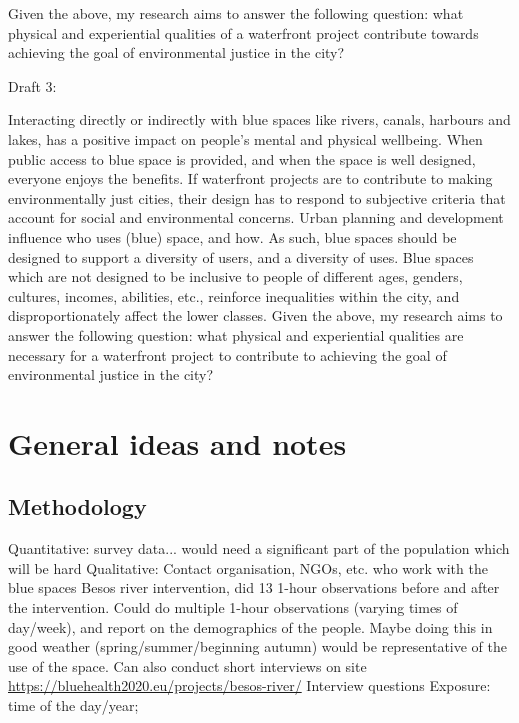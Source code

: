\documentclass{article}
\begin{document}
Given the above, my research aims to answer the following question: what physical and experiential qualities of a waterfront project contribute towards achieving the goal of environmental justice in the city?

Draft 3:

Interacting directly or indirectly with blue spaces like rivers, canals, harbours and lakes, has a positive impact on people’s mental and physical wellbeing. When public access to blue space is provided, and when the space is well designed, everyone enjoys the benefits. If waterfront projects are to contribute to making environmentally just cities, their design has to respond to subjective criteria that account for social and environmental concerns. Urban planning and development influence who uses (blue) space, and how. As such, blue spaces should be designed to support a diversity of users, and a diversity of uses.
Blue spaces which are not designed to be inclusive to people of different ages, genders, cultures, incomes, abilities, etc., reinforce inequalities within the city, and disproportionately affect the lower classes.
Given the above, my research aims to answer the following question: what physical and experiential qualities are necessary for a waterfront project to contribute to achieving the goal of environmental justice in the city?





\section{General ideas and notes}

\subsection{Methodology}

\begin{outline}
	\1 Quantitative: survey data... would need a significant part of the population which will be hard
	\1 Qualitative: 
		\2 Contact organisation, NGOs, etc. who work with the blue spaces
		\2 Besos river intervention, did 13 1-hour observations before and after the intervention. Could do multiple 1-hour observations (varying times of day/week), and report on the demographics of the people. Maybe doing this in good weather (spring/summer/beginning autumn) would be representative of the use of the space. Can also conduct short interviews on site  \url{https://bluehealth2020.eu/projects/besos-river/}
	\1 Interview questions
		\2 Exposure: time of the day/year; 
\end{outline}
\end{document}
